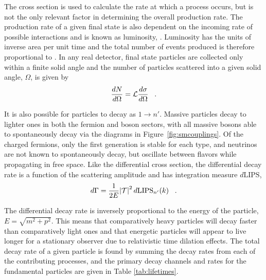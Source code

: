  The cross section is used to calculate the rate
  at which a process occurs, but is
  not the only relevant factor in determining
  the overall production rate.
 The production rate of a given final state
  is also dependent on the incoming
  rate of possible interactions and is 
  known as luminosity, \lumi.
 Luminosity has the units of inverse area per unit time
  and the total number of events produced
  is therefore proportional to \tlumi.
 In any real detector, final state particles
  are collected only within a finite
  solid angle and the number of particles
  scattered into a given solid angle, $\Omega$, is given by
\begin{equation}\label{eq:lumidef}
 \frac{dN}{d\Omega} = \mathcal L \frac{d\sigma}{d\Omega}\;\;\;.
\end{equation}



 It is also possible for particles to decay
  as $1\rightarrow n'$.
 Massive particles decay to lighter ones
  in both the fermion and boson sectors,
  with all massive bosons able to 
  spontaneously decay via the diagrams in
  Figure~\ref{fig:smcouplings}.
 Of the charged fermions, only the first
  generation is stable for each type, and
  neutrinos are not known to spontaneously
  decay, but oscillate between flavors
  while propagating in free space.
 Like the differential cross section,
  the differential decay rate is a function
  of the scattering amplitude and
  has integration measure $d\mathrm{LIPS}$, 
\begin{equation}\label{eq:diffdecayrate}
 d\Gamma = \frac{1}{2E}\abs{\mathcal{T}}^2d\mathrm{LIPS}_{n'}(k)\;\;\;.
\end{equation}

 The differential decay rate is 
  inversely proportional to the energy
  of the particle, $E=\sqrt{m^2 + p^2}$.
 This means that
  comparatively heavy particles will decay
  faster than comparatively light ones
  and that energetic particles
  will appear to live longer 
  for a stationary observer due to
  relativistic time dilation effects.
 The total decay rate of a given particle
  is found by summing the decay rates from
  each of the contributing processes,
  and the primary decay channels and rates
  for the fundamental particles
  are given in Table \ref{tab:lifetimes}.

